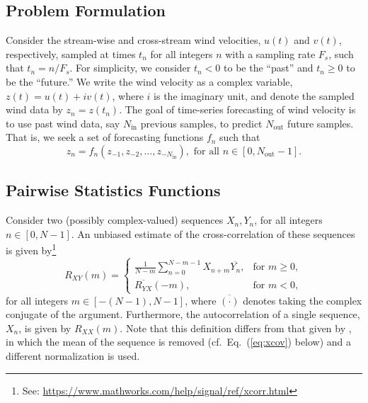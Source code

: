 \documentclass[11pt, oneside]{article}
\newcommand{\eqnref}[1]{Eq.~(\ref{#1})}
\begin{document}
\subsection{Problem Formulation}
Consider the stream-wise and cross-stream wind velocities, $u(t)$ and $v(t)$, respectively, sampled at times $t_n$ for all integers $n$ with a sampling rate $F_s$, such that $t_n = n/F_s$.
For simplicity, we consider $t_n < 0$ to be the ``past'' and $t_n \geq 0$ to be the ``future.''
We write the wind velocity as a complex variable, $z(t) = u(t) + i v(t)$, where $i$ is the imaginary unit, and denote the sampled wind data by $z_n = z(t_n)$.
The goal of time-series forecasting of wind velocity is to use past wind data, say $N_\text{in}$ previous samples, to predict $N_\text{out}$ future samples.
That is, we seek a set of forecasting functions $f_n$ such that
\begin{equation}
z_n = f_n (z_{-1}, z_{-2}, \dots, z_{-N_\text{in}} ), \text{ for all } n \in [0, N_\text{out} - 1].
\end{equation}

\subsection{Pairwise Statistics Functions}
Consider two (possibly complex-valued) sequences $X_n,Y_n$, for all integers $n \in [0,N-1]$.
An unbiased estimate of the cross-correlation of these sequences is given by\footnote{See: \url{https://www.mathworks.com/help/signal/ref/xcorr.html}}
\begin{equation}\label{eq:xcorr}
R_{XY}(m) =
\begin{cases}
\displaystyle \frac{1}{N - m} \sum_{n=0}^{N-m-1} X_{n+m} \overline{Y_n}, & \text{for } m \geq 0,\\[20pt]
\overline{R_{YX}}(-m), & \text{for } m < 0,
\end{cases}
\end{equation}
for all integers $m \in [-(N-1),N-1]$, where $\overline{(\cdot)}$ denotes taking the complex conjugate of the argument.
Furthermore, the autocorrelation of a single sequence, $X_n$, is given by $R_{XX}(m)$.
Note that this definition differs from that given by \citet[Sec.~8.2.1]{Stull1988}, in which the mean of the sequence is removed (cf.~\eqnref{eq:xcov} below) and a different normalization is used.
\end{document}

